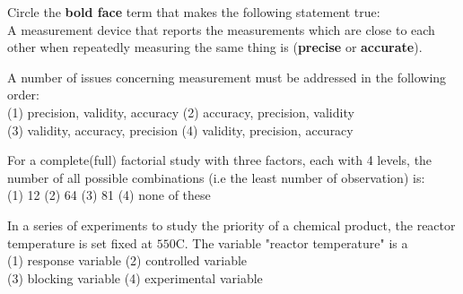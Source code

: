 \documentclass[addpoints]{examsetup}
\begin{document}




\examCoverPage

\begin{questions}

\question[2] 
Circle the \textbf{bold face} term that makes the following statement true: \\

A measurement device that reports the measurements which are close to each other when repeatedly measuring the same thing is (\textbf{precise} or \textbf{accurate}).
\vspace{1cm}

\question[2] 
A number of issues concerning measurement must be addressed in the following order:\vspace{0.2cm}\\

(1) precision, validity, accuracy \hspace{1cm} (2) accuracy, precision, validity\\
(3) validity, accuracy, precision \hspace{1cm} (4) validity, precision, accuracy

\vspace{1cm}

\question[2]
For a complete(full) factorial study with three factors, each with 4 levels, the number of all possible combinations (i.e the least number of observation) is:\vspace{0.2cm}\\

(1) 12\hspace{0.5cm} (2) 64\hspace{0.5cm} (3) 81\hspace{0.5cm} (4) none of these

\vspace{3cm}

\question[2]
In a series of experiments to study the priority of a chemical product, the reactor temperature is set fixed at $550$\textdegree C. The variable "reactor temperature" is a \vspace{0.2cm}\\

(1) response variable\hspace{1cm} (2) controlled variable\\
(3) blocking variable\hspace{1cm} (4) experimental variable
\vspace{1cm}
\pagebreak


\end{questions}
\end{document}
